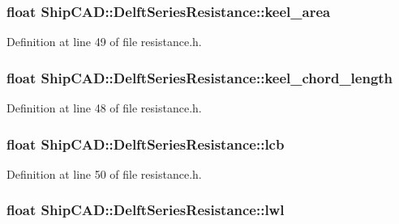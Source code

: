 \hypertarget{structShipCAD_1_1DelftSeriesResistance_ab1bf49519c2ed054b7699898d7f5aead}{
\subsubsection[{keel\-\_\-area}]{\setlength{\rightskip}{0pt plus 5cm}float Ship\-C\-A\-D\-::\-Delft\-Series\-Resistance\-::keel\-\_\-area}}\label{structShipCAD_1_1DelftSeriesResistance_ab1bf49519c2ed054b7699898d7f5aead}


Definition at line 49 of file resistance.\-h.

\hypertarget{structShipCAD_1_1DelftSeriesResistance_a986244b5c6944f01dbdae5d54b895c84}{
\subsubsection[{keel\-\_\-chord\-\_\-length}]{\setlength{\rightskip}{0pt plus 5cm}float Ship\-C\-A\-D\-::\-Delft\-Series\-Resistance\-::keel\-\_\-chord\-\_\-length}}\label{structShipCAD_1_1DelftSeriesResistance_a986244b5c6944f01dbdae5d54b895c84}


Definition at line 48 of file resistance.\-h.

\hypertarget{structShipCAD_1_1DelftSeriesResistance_aca93b2c11316e29b2f98a3bdcdf65bc5}{
\subsubsection[{lcb}]{\setlength{\rightskip}{0pt plus 5cm}float Ship\-C\-A\-D\-::\-Delft\-Series\-Resistance\-::lcb}}\label{structShipCAD_1_1DelftSeriesResistance_aca93b2c11316e29b2f98a3bdcdf65bc5}


Definition at line 50 of file resistance.\-h.

\hypertarget{structShipCAD_1_1DelftSeriesResistance_a7232b8ea3003087a4772a650319ec8f2}{
\subsubsection[{lwl}]{\setlength{\rightskip}{0pt plus 5cm}float Ship\-C\-A\-D\-::\-Delft\-Series\-Resistance\-::lwl}}\label{structShipCAD_1_1DelftSeriesResistance_a7232b8ea3003087a4772a650319ec8f2}


